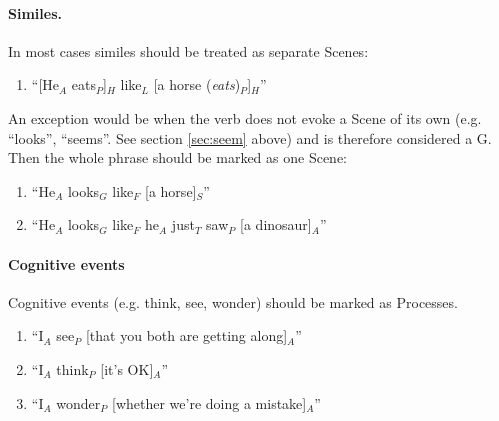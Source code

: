 \documentclass[11pt]{article}
\newcommand{\be}{\begin{enumerate}}
\newcommand{\ee}{\end{enumerate}}
\newcommand{\rem}[1]{{(\it #1})}
\begin{document}


\paragraph{Similes.} In most cases similes should be treated as separate Scenes:
\be
\item
``[He$_A$ eats$_P$]$_H$ like$_L$ [a horse \rem{eats}$_P$]$_H$''
\ee

An exception would be when the verb does not evoke a Scene of its own (e.g. ``looks'', ``seems''. See section \ref {sec:seem} above) and is therefore considered a G. Then the whole phrase should be marked as one Scene:
\be
\item
``He$_A$ looks$_G$ like$_F$ [a horse]$_S$''
\item
``He$_A$ looks$_G$ like$_F$ he$_A$ just$_T$ saw$_P$ [a dinosaur]$_A$''
\ee




\paragraph{Cognitive events} Cognitive events (e.g. think, see, wonder) should be marked as Processes. 

\be 
\item 
``I$_A$ see$_P$ [that you both are getting along]$_A$''
\item
``I$_A$ think$_P$ [it's OK]$_A$''
\item
``I$_A$ wonder$_P$ [whether we're doing a mistake]$_A$''
\ee
\end{document}
